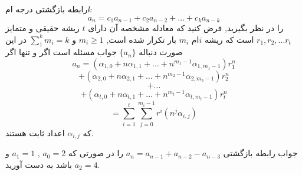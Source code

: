 \begin{THEOREM}
    \p
    رابطه‌ بازگشتی درجه 
    ام$k$
    \[a_n=c_{1}a_{n-1}+c_{2}a_{n-2}+...+c_{k}a_{n-k}\]
    را در نظر بگیرید, فرض کنید که معادله مشخصه آن دارای 
    $t$
    ریشه حقیقی و متمایز 
    $r_1, r_2, ...r_t $
    است که ریشه
    $i$ام 
    $m_i$
    بار تکرار شده است,  
    $m_i \geq 1$
    و
    $\sum_1^k m_i=k$
    در این صورت دنباله 
    $\{a_n\}$
    جواب مسئله است اگر و تنها اگر
    \[a_n=(\alpha_{1,0}+ n\alpha_{1,1}+...+n^{m_1-1}\alpha_{1,m_1-1})r_1^n\]
    \[+(\alpha_{2,0}+ n\alpha_{2,1}+...+n^{m_2-1}\alpha_{2,m_2-1})r_2^n\]
    \[+...\]
    \[+(\alpha_{t,0}+ n\alpha_{t,1}+...+n^{m_t-1}\alpha_{t,m_t-1})r_t^n\]
    \[=\sum_{i=1}^t\sum_{j=0}^{m_i-1}r^i(n^j\alpha_{i,j})\]
    که
    $\alpha_{i,j}$
    اعداد ثابت هستند.

\end{THEOREM}

\begin{PROBLEM}
    جواب رابطه‌ بازگشتی 
    $a_n=a_{n-1}+a_{n-2}-a_{n-3}$
    را در صورتی که
    $a_0=2$
    ,
    $a_1=1$
    و
    $a_2=4$
    باشد به دست آورید.
\end{PROBLEM}
